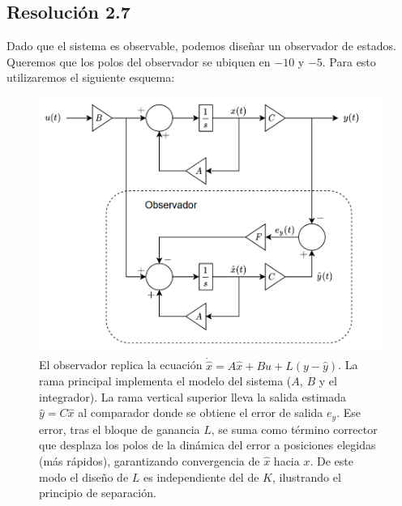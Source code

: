 \documentclass[
  11pt,
  letterpaper,
   addpoints,
  answers
  ]{exam}
\begin{document}
\begin{solution}
\subsection*{Resolución 2.7}
Dado que el sistema es observable, podemos diseñar un observador de estados. Queremos que los polos del observador se ubiquen en $-10$ y $-5$. Para esto utilizaremos el siguiente esquema:
  \begin{figure}[H]\centering
    \includegraphics[width=.6\textwidth]{../figures/Auxiliar_4_3.png}
    \caption{El observador replica la ecuación $\dot{\hat x}=A\hat x + Bu + L(y-\hat y)$. La rama principal implementa el modelo del sistema ($A$, $B$ y el integrador). La rama vertical superior lleva la salida estimada $\hat y = C\hat x$ al comparador donde se obtiene el error de salida $e_y$. Ese error, tras el bloque de ganancia $L$, se suma como término corrector que desplaza los polos de la dinámica del error a posiciones elegidas (más rápidos), garantizando convergencia de $\hat x$ hacia $x$. De este modo el diseño de $L$ es independiente del de $K$, ilustrando el principio de separación.}
  \end{figure}


\end{solution}
\end{document}
